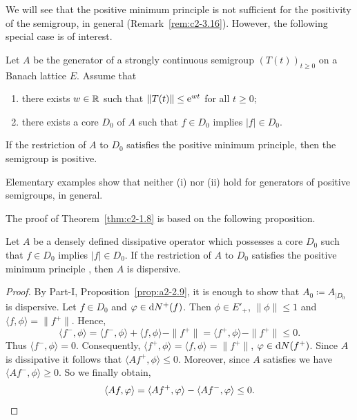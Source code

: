 We will see that the positive minimum principle is not sufficient for the positivity of the semigroup, in general (Remark~\ref{rem:c2-3.16}).
However, the following special case is of interest.
\begin{theorem}\label{thm:c2-1.8}
%
Let $A$ be the generator of a strongly continuous semigroup $(T(t))_{t \geq 0}$ on a Banach lattice $E$.
Assume that
\begin{enumerate}[\upshape (i)]
\item \label{thm:c2-1.8-1}
there exists $w \in \mathbb{R}$ such that $\|T(t)\| \leq \eu^{wt}$ for all $t \geq 0$;
\item \label{thm:c2-1.8-2}
there exists a core $D_{0}$ of\/ $A$ such that $f \in D_{0}$ implies $|f| \in D_{0}$.
\end{enumerate}
If the restriction of\/ $A$ to $D_{0}$ satisfies the positive minimum principle, then the semigroup is positive.
\end{theorem}
\begin{remark*}\label{rem:c2-1.8-Claude}
%
Elementary examples show that neither \upshape(i) nor \upshape(ii) hold for generators of positive semigroups, in general.
\end{remark*}
The proof of Theorem~\ref{thm:c2-1.8}   is based on the following proposition.
\begin{proposition}\label{prop:c2-1.9}
%
Let $A$ be a densely defined dissipative operator which possesses a core $D_{0}$ such that $f \in D_{0}$ implies $|f| \in D_{0}$.
If the restriction of\/ $A$ to $D_{0}$ satisfies the positive minimum principle , then $A$ is dispersive.
\end{proposition}
\begin{proof}%
By Part-I, Proposition~\ref{prop:a2-2.9}, it is enough to show that $A_{0} \coloneq A_{\vert D_{0}}$ is dispersive.
Let $f \in D_{0}$ and $\phi \in \diff{N^{+}}(f)$.
Then $\phi \in E'_{+}$, $\|\phi\| \leq 1$ and $\langle f,\phi \rangle = \|f^{+}\|$.
Hence, 
%
\[
	\langle f^{-},\phi \rangle = \langle f^{-},\phi \rangle + \langle f,\phi \rangle - \|f^{+}\| = \langle f^{+},\phi \rangle - \|f^{+}\| \leq 0 .
\]
%
Thus $\langle f^{-},\phi \rangle = 0$.
Consequently, $\langle f^{+},\phi \rangle = \langle f,\phi \rangle = \|f^{+}\|$, \ie $\phi \in \diff{N}(f^{+})$.
Since $A$ is dissipative it follows that $\langle Af^{+},\phi \rangle \leq 0$.
Moreover, since $A$ satisfies  we have $\langle Af^{-},\phi \rangle \geq 0$.
So we finally obtain, 
\begin{equation*}
\langle Af,\phi \rangle = \langle Af^{+},\phi \rangle - \langle Af^{-},\phi \rangle \leq 0 .
\qedhere
\end{equation*}
\end{proof}

